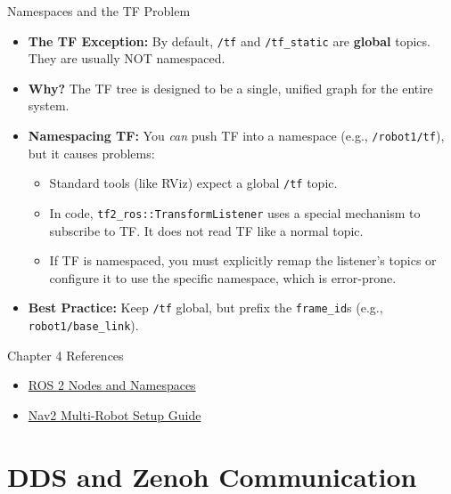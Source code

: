 \documentclass[aspectratio=169]{beamer}
\begin{document}
\begin{frame}[t]{Namespaces and the TF Problem}
    \begin{itemize}
        \item \textbf{The TF Exception:} By default, \texttt{/tf} and \texttt{/tf\_static} are \textbf{global} topics. They are usually NOT namespaced.
        \item \textbf{Why?} The TF tree is designed to be a single, unified graph for the entire system.
        \item \textbf{Namespacing TF:} You \textit{can} push TF into a namespace (e.g., \texttt{/robot1/tf}), but it causes problems:
        \begin{itemize}
            \item Standard tools (like RViz) expect a global \texttt{/tf} topic.
            \item In code, \texttt{tf2\_ros::TransformListener} uses a special mechanism to subscribe to TF. It does not read TF like a normal topic.
            \item If TF is namespaced, you must explicitly remap the listener's topics or configure it to use the specific namespace, which is error-prone.
        \end{itemize}
        \item \textbf{Best Practice:} Keep \texttt{/tf} global, but prefix the \texttt{frame\_id}s (e.g., \texttt{robot1/base\_link}).
    \end{itemize}
\end{frame}

\begin{frame}[t]{Chapter 4 References}
    \begin{itemize}
        \item \href{https://docs.ros.org/en/humble/Concepts/Basic/About-Nodes.html\#namespaces}{ROS 2 Nodes and Namespaces}
        \item \href{https://navigation.ros.org/setup_guides/index.html}{Nav2 Multi-Robot Setup Guide}
    \end{itemize}
\end{frame}

\section{DDS and Zenoh Communication}
\end{document}
